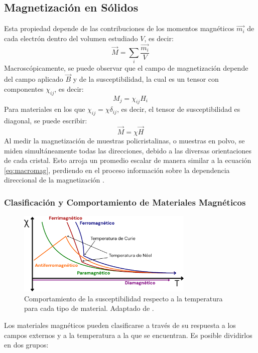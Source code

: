 \documentclass[../main.tex]{subfiles}
\begin{document}
\subsection{Magnetización en Sólidos}
Esta propiedad depende de las contribuciones de los momentos magnéticos $\vec{m_i}$ de cada electrón dentro del volumen estudiado $V$, es decir:
\begin{equation}
    \vec{M}=\sum_i\dfrac{\vec{m_i}}{V}
    \label{eq:micromag}
\end{equation}
Macroscópicamente, se puede observar que el campo de magnetización depende del campo aplicado $\vec{B}$ y de la susceptibilidad, la cual es un tensor con componentes $\chi_{ij}$, es decir:
\begin{equation}
    M_j=\chi_{ij}H_i
    \label{eq:tensormag}
\end{equation}
Para materiales en los que $\chi_{ij}=\chi\delta_{ij}$, es decir, el tensor de susceptibilidad es diagonal, se puede escribir:
\begin{equation}
    \vec{M}=\chi\vec{H}
    \label{eq:macromag}
\end{equation}
Al medir la magnetización de muestras policristalinas, o muestras en polvo, se miden simultáneamente todas las direcciones, debido a las diversas orientaciones de cada cristal. Esto arroja un promedio escalar de manera similar a la ecuación \ref{eq:macromag}, perdiendo en el proceso información sobre la dependencia direccional de la magnetización \cite{Mugiraneza2022}.
\subsubsection{Clasificación y Comportamiento de Materiales Magnéticos} \label{sec:magtemp}
\begin{figure}[H]
    \centering
    \includegraphics[width=0.75\textwidth]{fig/chitemp.png}
    \caption{Comportamiento de la susceptibilidad respecto a la temperatura para cada tipo de material. Adaptado de \cite{Ohl2021}.}
    \label{fig:chitemp}
\end{figure}
Los materiales magnéticos pueden clasificarse a través de su respuesta a los campos externos y a la temperatura a la que se encuentran. Es posible dividirlos en dos grupos:
\end{document}
